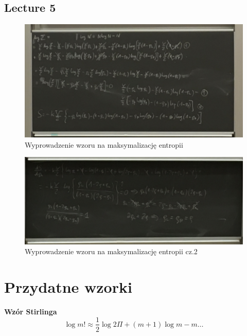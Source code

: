 \documentclass[12pt,a4paper]{report}
\renewcommand{\emph}{\textbf}
\begin{document}
\section{Lecture 5}

\begin{figure}[!ht]
    \centering
    \includegraphics[width=\linewidth]{Wyk_5_Rys_2.JPG}
    \caption{Wyprowadzenie wzoru na maksymalizację entropii}
    \label{fig:lec_5:app:maksymalizacja_entropii}
\end{figure}


\begin{figure}[!ht]
    \centering
    \includegraphics[width=\linewidth]{Wyk_5_Rys_3.JPG}
    \caption{Wyprowadzenie wzoru na maksymalizację entropii cz.2}
    \label{fig:lec_5:app:maksymalizacja_entropii_2}
\end{figure}

\chapter{Przydatne wzorki}

\emph{Wzór Stirlinga}
\begin{equation}
    \log m! \approx \frac12 \log 2 \Pi + (m+1) \log m - m \dots
    \label{eq:app_wzory:stirling}
\end{equation}
\end{document}
